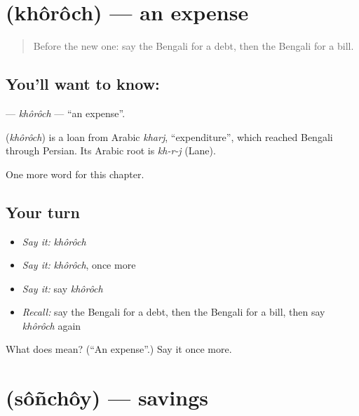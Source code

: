\section[\texorpdfstring{\bn{খরচ} (khôrôch)}{খরচ (khôrôch)}]{ (khôrôch) — an expense}

\label{lesson:BN-C176-khoroch}



\begin{quote}
Before the new one: say the Bengali for a debt, then the Bengali for a bill.
\end{quote}

\subsection*{You'll want to know: }
\textbf{} — \emph{khôrôch} — \textquotedblleft{}an expense\textquotedblright{}.

\begin{cousinweb}
\textbf{} (\emph{khôrôch}) is a loan from Arabic \emph{kharj}, \textquotedblleft{}expenditure\textquotedblright{}, which reached Bengali through Persian. Its Arabic root is \emph{kh-r-j} (Lane).
\end{cousinweb}

\begin{grammarlens}[title={What you've built}]
One more word for this chapter.
\end{grammarlens}

\subsection*{Your turn}
\begin{itemize}
\raggedright
  \item \emph{Say it:} \emph{khôrôch}
  \item \emph{Say it:} \emph{khôrôch}, once more
  \item \emph{Say it:} say \emph{khôrôch}
  \item \emph{Recall:} say the Bengali for a debt, then the Bengali for a bill, then say \emph{khôrôch} again
\end{itemize}

\begin{tcolorbox}[breakable,colback=teal!4,colframe=teal!35!black,title={Before you move on}]
What does  mean? (\textquotedblleft{}An expense\textquotedblright{}.) Say it once more.
\end{tcolorbox}
\section[\texorpdfstring{\bn{সঞ্চয়} (sôñchôy)}{সঞ্চয় (sôñchôy)}]{ (sôñchôy) — savings}

